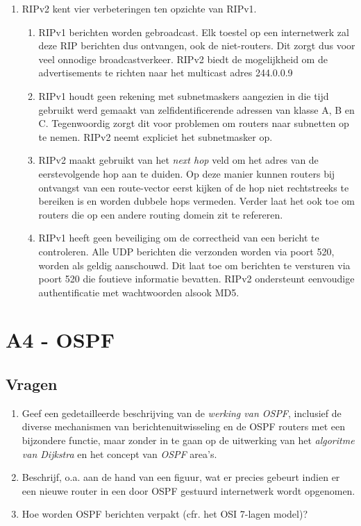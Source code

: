 \documentclass{report}
\begin{document}
\begin{enumerate}
\begin{enumerate}
	\end{enumerate}
	\item RIPv2 kent vier verbeteringen ten opzichte van RIPv1.
	\begin{enumerate}
		\item RIPv1 berichten worden gebroadcast. Elk toestel op een internetwerk zal deze RIP berichten dus ontvangen, ook de niet-routers. Dit zorgt dus voor veel onnodige broadcastverkeer. RIPv2 biedt de mogelijkheid om de advertisements te richten naar het multicast adres 244.0.0.9 
		\item RIPv1 houdt geen rekening met subnetmaskers aangezien in die tijd gebruikt werd gemaakt van zelfidentificerende adressen van klasse A, B en C. Tegenwoordig zorgt dit voor problemen om routers naar subnetten op te nemen. RIPv2 neemt expliciet het subnetmasker op.
		\item RIPv2 maakt gebruikt van het \textit{next hop} veld om het adres van de eerstevolgende hop aan te duiden. Op deze manier kunnen routers bij ontvangst van een route-vector eerst kijken of de hop niet rechtstreeks te bereiken is en worden dubbele hops vermeden. Verder laat het ook toe om routers die op een andere routing domein zit te refereren.
		\item RIPv1 heeft geen beveiliging om de correctheid van een bericht te controleren. Alle UDP berichten die verzonden worden via poort 520, worden als geldig aanschouwd. Dit laat toe om berichten te versturen via poort 520 die foutieve informatie bevatten. RIPv2 ondersteunt eenvoudige authentificatie met wachtwoorden alsook MD5. 
	\end{enumerate}
\end{enumerate}

\newpage




\newpage



\newpage
\section{A4 - OSPF}
\subsection{Vragen}
\begin{enumerate}
	\item Geef een gedetailleerde beschrijving van de \textit{werking van OSPF}, inclusief de diverse mechanismen van berichtenuitwisseling en de OSPF routers met een bijzondere functie, maar zonder in te gaan op de uitwerking van het \textit{algoritme van Dijkstra} en het concept van \textit{OSPF} area's.
	\item Beschrijf, o.a. aan de hand van een figuur, wat er precies gebeurt indien er een nieuwe router in een door OSPF gestuurd internetwerk wordt opgenomen.
	\item Hoe worden OSPF berichten verpakt (cfr. het OSI 7-lagen model)?
\end{enumerate}
\end{document}

